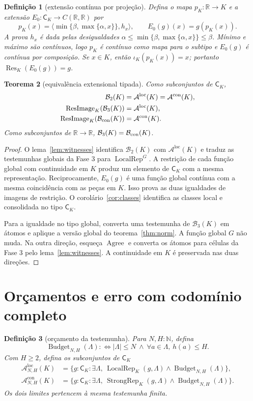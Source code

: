 \documentclass[11pt,a4paper]{article}
\newtheorem{definicao}{Definição}[section]
\newtheorem{teorema}[definicao]{Teorema}
\newcommand{\N}{\mathbb N}
\newcommand{\R}{\mathbb R}
\newcommand{\CK}{\mathsf C_K}
\newcommand{\Agree}{\operatorname{Agree}}
\newcommand{\Loc}{\operatorname{LocalRep}}
\newcommand{\Str}{\operatorname{StrongRep}}
\newcommand{\Res}{\operatorname{Res}}
\newcommand{\ImageRes}{\operatorname{ResImage}}
\newcommand{\Aloc}{\mathcal A^{\mathrm{loc}}}
\newcommand{\Astr}{\mathcal A^{\mathrm{con}}}
\begin{document}
\begin{definicao}[extensão contínua por projeção]\label{def:clamp}
Defina o mapa $p_K:\R\to K$ e a extensão $E_0:\CK\to C(\R,\R)$ por
\[
 p_K(x)=\langle\min\{\beta,\max\{\alpha,x\}\},h_x\rangle,
 \qquad E_0(g)(x)=g(p_K(x)).
\]
A prova $h_x$ é dada pelas desigualdades
$\alpha\le\min\{\beta,\max\{\alpha,x\}\}\le\beta$.
Mínimo e máximo são contínuos, logo $p_K$ é contínuo como mapa
para o subtipo e $E_0(g)$ é contínua por composição.
Se $x\in K$, então $\iota_K(p_K(x))=x$; portanto
$\Res_K(E_0(g))=g$.
\end{definicao}

\begin{teorema}[equivalência extensional tipada]\label{thm:bridge}
Como subconjuntos de $\CK$,
\begin{align*}
 \mathcal B_2(K)&=\Aloc(K)=\Astr(K),\\
 \ImageRes_K(\mathcal B_3(K))&=\Aloc(K),\\
 \ImageRes_K(\mathcal B_{\rm con}(K))&=\Astr(K).
\end{align*}
Como subconjuntos de $\R\to\R$,
$\mathcal B_3(K)=\mathcal B_{\rm con}(K)$.
\end{teorema}
\begin{proof}
O lema~\ref{lem:witnesses} identifica $\mathcal B_2(K)$ com
$\Aloc(K)$ e traduz as testemunhas globais da Fase 3 para
$\Loc^G$. A restrição de cada função global com continuidade em
$K$ produz um elemento de $\CK$ com a mesma representação.
Reciprocamente, $E_0(g)$ é uma função global contínua com a mesma
coincidência com as peças em $K$. Isso prova as duas igualdades
de imagens de restrição. O corolário~\ref{cor:classes} identifica
as classes local e consolidada no tipo $\CK$.

Para a igualdade no tipo global, converta uma testemunha de
$\mathcal B_3(K)$ em átomos e aplique a versão global do
teorema~\ref{thm:norm}. A função global $G$ não muda. Na outra
direção, esqueça $\Agree$ e converta os átomos para células da
Fase 3 pelo lema~\ref{lem:witnesses}. A continuidade em $K$ é
preservada nas duas direções.
\end{proof}

\section{Orçamentos e erro com codomínio completo}
\label{sec:error}

\begin{definicao}[orçamento da testemunha]
Para $N,H:\N$, defina
\[
 \operatorname{Budget}_{N,H}(\Lambda):\Longleftrightarrow
 |\Lambda|\le N\ \land\ \forall a\in\Lambda,\ h(a)\le H.
\]
Com $H\ge2$, defina os subconjuntos de $\CK$
\begin{align*}
 \Aloc_{N,H}(K)&=\{g:\CK:\exists\Lambda,\
       \Loc_K(g,\Lambda)\land\operatorname{Budget}_{N,H}(\Lambda)\},\\
 \Astr_{N,H}(K)&=\{g:\CK:\exists\Lambda,\
       \Str_K(g,\Lambda)\land\operatorname{Budget}_{N,H}(\Lambda)\}.
\end{align*}
Os dois limites pertencem à mesma testemunha finita.
\end{definicao}
\end{document}
